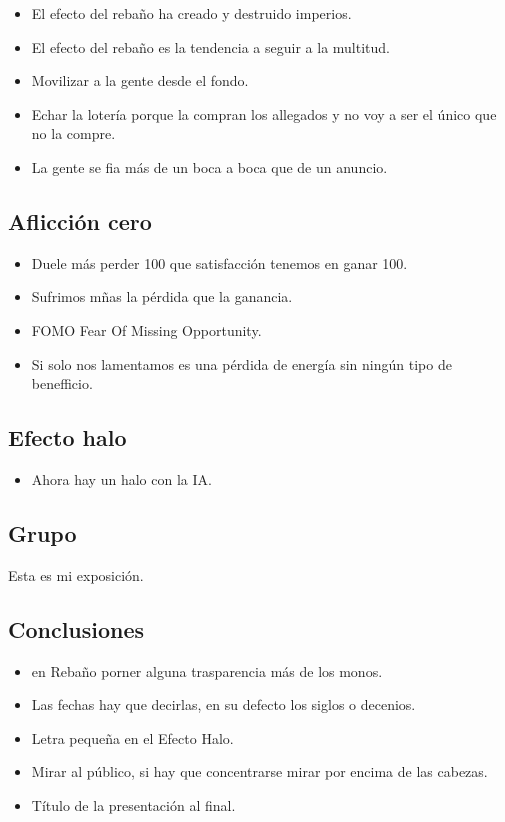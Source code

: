 \documentclass[12pt, a4paper, twoside]{article}
\begin{document}
\begin{itemize}
    \item El efecto del rebaño ha creado y destruido imperios.
    \item El efecto del rebaño es la tendencia a seguir a la multitud.
    \item Movilizar a la gente desde el fondo.
    \item Echar la lotería porque la compran los allegados y no voy a ser el único que no la compre.
    \item La gente se fia más de un boca a boca que de un anuncio.
\end{itemize}



\subsection{Aflicción cero}

\begin{itemize}
    \item Duele más perder 100 que satisfacción tenemos en ganar 100.
    \item Sufrimos mñas la pérdida que la ganancia.
    \item FOMO Fear Of Missing Opportunity.
    \item Si solo nos lamentamos es una pérdida de energía sin ningún tipo de benefficio.
\end{itemize}

\subsection{Efecto halo}
\begin{itemize}
    \item Ahora hay un halo con la IA.
\end{itemize}

\subsection{Grupo}

Esta es mi exposición.
\subsection{Conclusiones}
\begin{itemize}
    \item en Rebaño porner alguna trasparencia más de los monos.
    \item Las fechas hay que decirlas, en su defecto los siglos o decenios.
    \item Letra pequeña en el Efecto Halo.
    \item Mirar al público, si hay que concentrarse mirar por encima de las cabezas.
    \item Título de la presentación al final.
\end{itemize}
\end{document}
